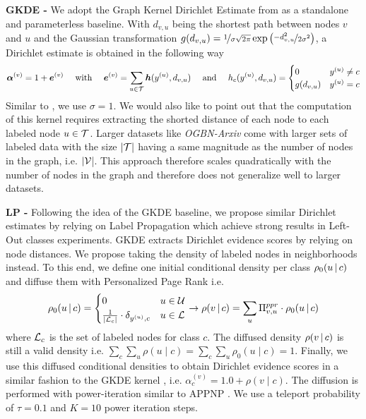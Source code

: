 \textbf{GKDE - } We adopt the Graph Kernel Dirichlet Estimate from \citep{Zhao2020} as a standalone and parameterless baseline. With $d_{v,u}$ being the shortest path between nodes $v$ and $u$ and the Gaussian 
transformation $g(d_{v,u}) = \nicefrac{1}{\sigma \sqrt{2\pi}} \exp \left(\nicefrac{-d_{v,u}^2}{2\sigma^2}\right)$, a Dirichlet estimate is obtained in the following way
\begin{equation}
    \bm{\alpha}^{(v)} = 1 + \bm{e}^{(v)} \quad \text{ with } \quad \bm{e}^{(v)} = \sum_{u \in \mathcal{T}} \bm{h}(y^{(u)}, d_{v,u}) \quad \text{ and } \quad h_c(y^{(u)}, d_{v,u}) = \begin{cases}0 & y^{(u)} \neq c\\ g(d_{v,u}) &  y^{(u)} = c \end{cases}
\end{equation}
Similar to \citep{Zhan2020}, we use $\sigma=1$. We would also like to point out that the computation of this kernel requires extracting the shorted distance of each node to each labeled node $u \in \mathcal{T}$. Larger datasets like \emph{OGBN-Arxiv} come with larger sets of labeled data with the size $|\mathcal{T}|$ having a same magnitude as the number of nodes in the graph, i.e. $|\mathcal{V}$|. This approach therefore scales quadratically with the number of nodes in the graph and therefore does not generalize well to larger datasets. 

\textbf{LP - } Following the idea of the GKDE baseline, we propose similar Dirichlet estimates by relying on Label Propagation which achieve strong results in Left-Out classes experiments. GKDE extracts Dirichlet evidence scores by relying on node distances. We propose taking the density of labeled nodes in neighborhoods instead. To this end, we define one initial conditional density per class $\rho_0(u \,|\, c)$ and diffuse them with Personalized Page Rank i.e.
\begin{equation}
\rho_0(u \,|\, c) = 
\begin{cases}
0 & u \in \mathcal{U} \\
\frac{1}{|\mathcal{L}_c|} \cdot \delta_{y^{(u)}, c} & u \in \mathcal{L}
\end{cases} \rightarrow \rho(v \,|\, c) = \sum_u \Pi^{ppr}_{v, u}\cdot \rho_0(u \,|\, c)
\end{equation}
where $\mathcal{L}_c$ is the set of labeled nodes for class $c$. The diffused density $\rho(v \,|\, c)$ is still a valid density i.e. $\sum_c \sum_u \rho(u\mid c) = \sum_c \sum_u \rho_0(u\mid c) = 1$. Finally, we use this diffused conditional densities to obtain Dirichlet evidence scores in a similar fashion to the GKDE kernel \citep{Zhao2020}, i.e. $\alpha_c^{(v)} = 1.0 + \rho(v\mid c)$. The diffusion is performed with power-iteration similar to APPNP \citep{Klicpera2018}. We use a teleport probability of $\tau=0.1$ and $K=10$ power iteration steps.

